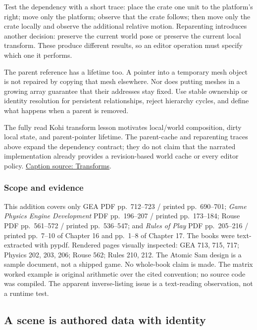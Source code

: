 Test the dependency with a short trace: place the crate one unit to the platform's right; move only the platform; observe that the crate follows; then move only the crate locally and observe the additional relative motion. Reparenting introduces another decision: preserve the current world pose or preserve the current local transform. These produce different results, so an editor operation must specify which one it performs.

The parent reference has a lifetime too. A pointer into a temporary mesh object is not repaired by copying that mesh elsewhere. Nor does putting meshes in a growing array guarantee that their addresses stay fixed. Use stable ownership or identity resolution for persistent relationships, reject hierarchy cycles, and define what happens when a parent is removed.

The fully read Kohi transform lesson motivates local/world composition, dirty local state, and parent-pointer lifetime. The parent-cache and reparenting traces above expand the dependency contract; they do not claim that the narrated implementation already provides a revision-based world cache or every editor policy. \href{https://www.youtube.com/watch?v=r2535XLneiI}{Caption source: Transforms}.

\subsubsection{Scope and evidence}\label{06-engine-ii-ch032-scope-and-evidence}

\hypertarget{06-engine-ii-ch032-scope-and-evidence}{}

This addition covers only GEA PDF pp.~712--723 / printed pp.~690--701; \emph{Game Physics Engine Development} PDF pp.~196--207 / printed pp.~173--184; Rouse PDF pp.~561--572 / printed pp.~536--547; and \emph{Rules of Play} PDF pp.~205--216 / printed pp.~7--10 of Chapter 16 and pp.~1--8 of Chapter 17. The books were text-extracted with pypdf. Rendered pages visually inspected: GEA 713, 715, 717; Physics 202, 203, 206; Rouse 562; Rules 210, 212. The Atomic Sam design is a sample document, not a shipped game. No whole-book claim is made. The matrix worked example is original arithmetic over the cited convention; no source code was compiled. The apparent inverse-listing issue is a text-reading observation, not a runtime test.

\subsection{A scene is authored data with identity}\label{06-engine-ii-ch032-a-scene-is-authored-data-with-identity}

